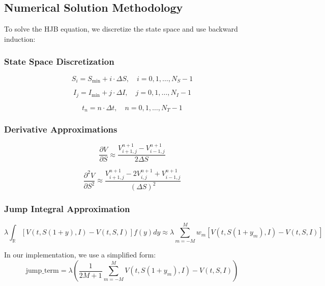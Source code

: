 \documentclass[onecolumn,ieee]{arithmaxresearch}
\begin{document}
\subsection{Numerical Solution Methodology}

To solve the HJB equation, we discretize the state space and use backward induction:

\subsubsection{State Space Discretization}
\begin{equation}
S_i = S_{\min} + i \cdot \Delta S, \quad i = 0, 1, \ldots, N_S-1
\end{equation}

\begin{equation}
I_j = I_{\min} + j \cdot \Delta I, \quad j = 0, 1, \ldots, N_I-1
\end{equation}

\begin{equation}
t_n = n \cdot \Delta t, \quad n = 0, 1, \ldots, N_T-1
\end{equation}

\subsubsection{Derivative Approximations}
\begin{equation}
\frac{\partial V}{\partial S} \approx \frac{V^{n+1}_{i+1,j} - V^{n+1}_{i-1,j}}{2\Delta S}
\end{equation}

\begin{equation}
\frac{\partial^2 V}{\partial S^2} \approx \frac{V^{n+1}_{i+1,j} - 2V^{n+1}_{i,j} + V^{n+1}_{i-1,j}}{(\Delta S)^2}
\end{equation}

\subsubsection{Jump Integral Approximation}
\begin{equation}
\lambda \int_{\mathbb{R}} \left[V(t, S(1+y), I) - V(t, S, I)\right] f(y) dy \approx \lambda \sum_{m=-M}^{M} w_m \left[V(t, S(1+y_m), I) - V(t, S, I)\right]
\end{equation}

In our implementation, we use a simplified form:
\begin{equation}
\text{jump\_term} = \lambda \left(\frac{1}{2M+1}\sum_{m=-M}^{M} V(t, S(1+y_m), I) - V(t, S, I)\right)
\end{equation}
\end{document}

